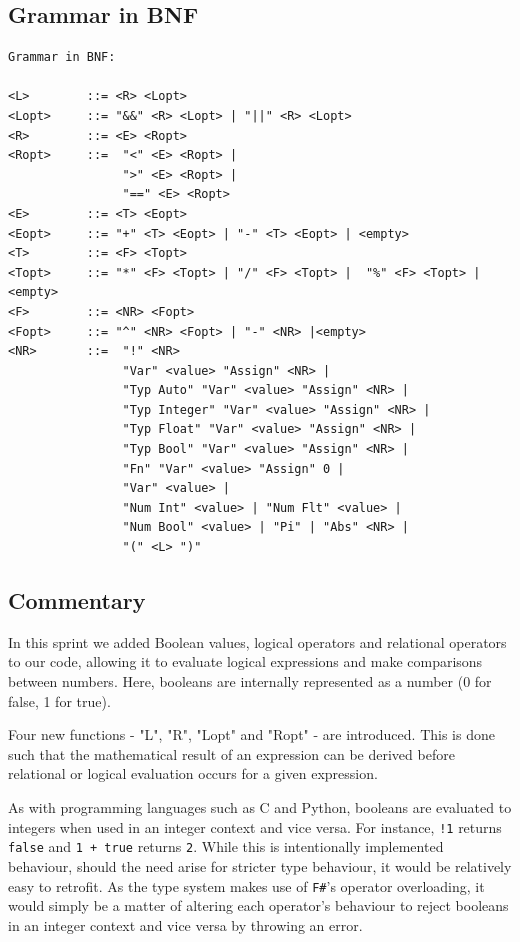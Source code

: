 \documentclass[a4paper, oneside, 11pt]{report}
\begin{document}
    \subsection{Grammar in BNF}
    \begin{verbatim}
Grammar in BNF:

<L>        ::= <R> <Lopt>
<Lopt>     ::= "&&" <R> <Lopt> | "||" <R> <Lopt>
<R>        ::= <E> <Ropt>
<Ropt>     ::=  "<" <E> <Ropt> |
                ">" <E> <Ropt> |
                "==" <E> <Ropt>
<E>        ::= <T> <Eopt>
<Eopt>     ::= "+" <T> <Eopt> | "-" <T> <Eopt> | <empty>
<T>        ::= <F> <Topt>
<Topt>     ::= "*" <F> <Topt> | "/" <F> <Topt> |  "%" <F> <Topt> |<empty>
<F>        ::= <NR> <Fopt>
<Fopt>     ::= "^" <NR> <Fopt> | "-" <NR> |<empty>
<NR>       ::=  "!" <NR>
                "Var" <value> "Assign" <NR> |
                "Typ Auto" "Var" <value> "Assign" <NR> |
                "Typ Integer" "Var" <value> "Assign" <NR> |
                "Typ Float" "Var" <value> "Assign" <NR> |
                "Typ Bool" "Var" <value> "Assign" <NR> |
                "Fn" "Var" <value> "Assign" 0 |
                "Var" <value> |
                "Num Int" <value> | "Num Flt" <value> |
                "Num Bool" <value> | "Pi" | "Abs" <NR> |
                "(" <L> ")"
    \end{verbatim}
    \subsection{Commentary}
    In this sprint we added Boolean values, logical operators and relational operators to our code, allowing it to evaluate logical expressions and make comparisons between numbers.
    Here, booleans are internally represented as a number (0 for false, 1 for true).

    Four new functions - "L", "R", "Lopt" and "Ropt" - are introduced.
    This is done such that the mathematical result of an expression can be derived before relational or logical evaluation occurs for a given expression.

    As with programming languages such as C and Python, booleans are evaluated to integers when used in an integer context and vice versa.
    For instance, \verb|!1| returns \verb|false| and \verb|1 + true| returns \verb|2|.
    While this is intentionally implemented behaviour, should the need arise for stricter type behaviour, it would be relatively easy to retrofit.
    As the type system makes use of \verb|F#|'s operator overloading, it would simply be a matter of altering each operator's behaviour to reject booleans in an integer context and vice versa by throwing an error.
\end{document}
